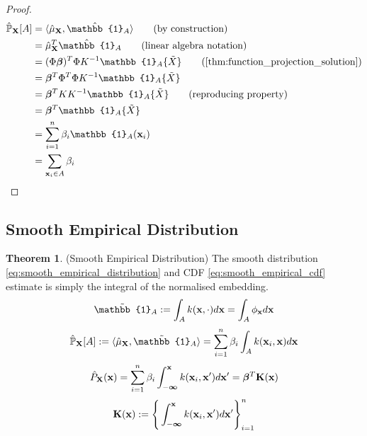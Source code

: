 \documentclass[twoside]{article} \usepackage{aistats2017}
\theoremstyle{definition}
\theoremstyle{theorem}
\newtheorem{theorem}{Theorem}[section]
\newcommand{\rv}[1]{{#1}}
\newcommand{\ds}[1]{\tilde{#1}}
\newcommand{\inner}[2]{{\langle #1, #2 \rangle}}
\begin{document}
		\begin{proof}
			\begin{align*}
					\hat{\mathbb{P}}_{\bvec{\rv{X}}}[A] &= \inner{\hat{\mu}_{\bvec{\rv{X}}}}{ \hat{\mathbb{1}}_{A}} \tag{by construction} \\
					&= \hat{\mu}_{\bvec{\rv{X}}}^{T}\hat{\mathbb{1}}_{A} \tag{linear algebra notation} \\
					&= (\Phi \bm{\beta})^{T} \Phi K^{-1} \mathbb{1}_{A}\{\ds{X}\} \tag{\cref{thm:function_projection_solution}} \\
					&= \bm{\beta}^{T} \Phi^{T} \Phi K^{-1} \mathbb{1}_{A}\{\ds{X}\} \\
					&= \bm{\beta}^{T} K K^{-1} \mathbb{1}_{A}\{\ds{X}\} \tag{reproducing property} \\
					&= \bm{\beta}^{T} \mathbb{1}_{A}\{\ds{X}\} \\
					&= \sum_{i = 1}^{n} \beta_{i} \mathbb{1}_{A}(\bvec{x}_{i}) \\
					&= \sum_{\bvec{x}_{i} \in A} \beta_{i}
			\end{align*}
		\end{proof}
		
	\subsection{Smooth Empirical Distribution}
	\label{sec:direct_quantile_regression:smooth_empirical_distribution}
		
		\begin{theorem} \label{thm:smooth_empirical_distribution_and_cdf}
			(Smooth Empirical Distribution)
			The smooth distribution \eqref{eq:smooth_empirical_distribution} and CDF \eqref{eq:smooth_empirical_cdf} estimate is simply the integral of the normalised embedding.
			\begin{equation}
				\tilde{\mathbb{1}}_{A} := \int_{A} k(\bvec{x}, \cdot) d\bvec{x} = \int_{A} \phi_{\bvec{x}} d\bvec{x}
			\label{eq:indicator_smooth}
			\end{equation}
			\begin{equation}
				\hat{\mathbb{P}}_{\bvec{\rv{X}}}[A] := \inner{\hat{\mu}_{\bvec{\rv{X}}}}{\tilde{\mathbb{1}}_{A}} = \sum_{i = 1}^{n} \beta_{i} \int_{A}  k(\bvec{x}_{i}, \bvec{x}) d\bvec{x}
			\label{eq:smooth_empirical_distribution}
			\end{equation}	
			\begin{equation}
				\hat{P}_{\bvec{\rv{X}}}(\bvec{x}) = \sum_{i = 1}^{n} \beta_{i} \int_{-\bm{\infty}}^{\bvec{x}}  k(\bvec{x}_{i}, \bvec{x}') d\bvec{x}' = \bm{\beta}^{T} \bvec{K}(\bvec{x})
			\label{eq:smooth_empirical_cdf}
			\end{equation}
			\begin{equation}
				\mathbf{K}(\mathbf{x}) := \Bigg\{ \int_{-\bm{\infty}}^{\mathbf{x}}  k(\mathbf{x}_{i}, \mathbf{x}') d\mathbf{x}' \Bigg\}_{i = 1}^{n}
			\label{eq:kernel_integral}
			\end{equation}
		\end{theorem}
			
\end{document}

